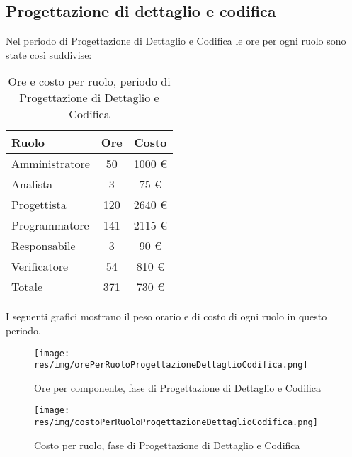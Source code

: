 \subsection{Progettazione di dettaglio e codifica}
Nel periodo di Progettazione di Dettaglio e Codifica le ore per ogni ruolo sono state così suddivise:

\begin{table}[H]
	\centering
	\begin{tabular}{ l c c }
		\textbf{Ruolo} & \textbf{Ore} & \textbf{Costo} \\
		\hline
		Amministratore & 50 & 1000 \euro \\
		Analista & 3 & 75 \euro \\
		Progettista & 120 & 2640 \euro \\
		Programmatore & 141 & 2115 \euro \\
		Responsabile & 3 & 90 \euro \\
		Verificatore & 54 & 810 \euro \\
		\hline
		Totale & 371 & 730 \euro \\
		\hline
	\end{tabular}
	\caption{Ore e costo per ruolo, periodo di Progettazione di Dettaglio e Codifica}
\end{table}

I seguenti grafici mostrano il peso orario e di costo di ogni ruolo in questo periodo.

\begin{figure}[H]
  \begin{center}
    \texttt{[image: res/img/orePerRuoloProgettazioneDettaglioCodifica.png]}
  \caption{Ore per componente, fase di Progettazione di Dettaglio e Codifica}
  \end{center} 
\end{figure}  

\begin{figure}[H]
  \begin{center}
    \texttt{[image: res/img/costoPerRuoloProgettazioneDettaglioCodifica.png]}
  \caption{Costo per ruolo, fase di Progettazione di Dettaglio e Codifica}
  \end{center} 
\end{figure}  


